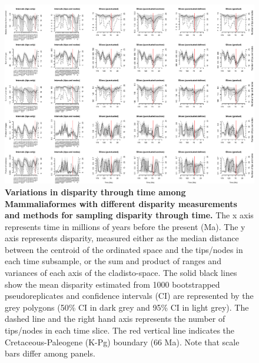 \begin{landscape}
\begin{figure}[!htbp]
\centering
    \includegraphics[width=\textwidth,height=\textheight,keepaspectratio]{Supplementaries/Figures/STD/Mammaliaformes_all_methods.pdf}
\caption[Comparison of all the disparity metrics and all the time sampling methods for Mammaliaformes]{\textbf{Variations in disparity through time among Mammaliaformes with different disparity measurements and methods for sampling disparity through time.} The x axis represents time in millions of years before the present (Ma). The y axis represents disparity, measured either as the median distance between the centroid of the ordinated space and the tips/nodes in each time subsample, or the sum and product of ranges and variances of each axis of the cladisto-space. The solid black lines show the mean disparity estimated from 1000 bootstrapped pseudoreplicates and confidence intervals (CI) are represented by the grey polygons (50\% CI in dark grey and 95\% CI in light grey). The dashed line and the right hand axis represents the number of tips/nodes in each time slice. The red vertical line indicates the Cretaceous-Paleogene (K-Pg) boundary (66 Ma). Note that scale bars differ among panels.}
\label{Supp_disparity_all_Mammaliaformes}
\end{figure}
\end{landscape}

